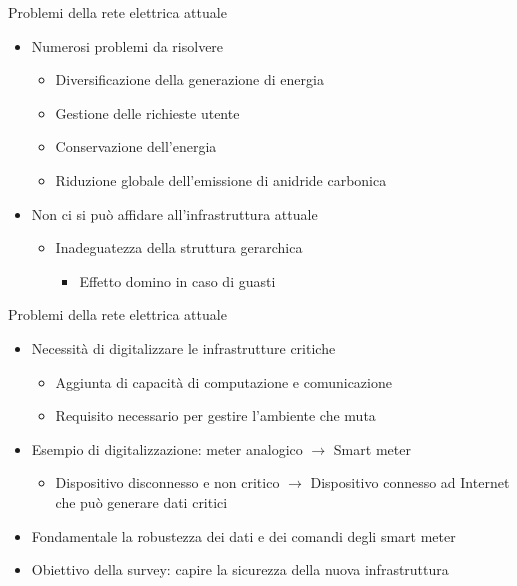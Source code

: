 \begin{frame}{Problemi della rete elettrica attuale}
	\begin{itemize}[<+- | alert@+>]
	\item Numerosi problemi da risolvere
		\begin{itemize}
		\item Diversificazione della generazione di energia
		\item Gestione delle richieste utente
		\item Conservazione dell’energia
		\item Riduzione globale dell’emissione di anidride carbonica
		\end{itemize}
	\item Non ci si può affidare all'infrastruttura attuale
		\begin{itemize}
			\item Inadeguatezza della struttura gerarchica
			 	\begin{itemize}
			 	\item Effetto domino in caso di guasti
			 	\end{itemize}
		\end{itemize}
	\end{itemize}
\end{frame}

\begin{frame}{Problemi della rete elettrica attuale}
	\begin{itemize}[<+- | alert@+>]
	\item Necessità di digitalizzare le infrastrutture critiche
		\begin{itemize}
		\item Aggiunta di capacità di computazione e comunicazione
		\item Requisito necessario per gestire l'ambiente che muta
		\end{itemize}
	\item Esempio di digitalizzazione: meter analogico $\rightarrow$ Smart meter
		\begin{itemize}
			\item Dispositivo disconnesso e non critico $\rightarrow$ Dispositivo connesso ad Internet che può generare dati critici
		\end{itemize}
\item Fondamentale la robustezza dei dati e dei comandi degli smart meter
\item Obiettivo della survey: capire la sicurezza della nuova infrastruttura
	\end{itemize}
\end{frame}

